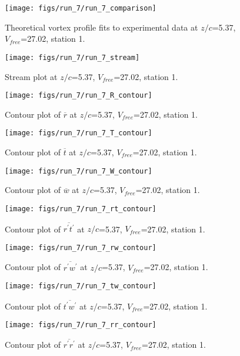 \begin{figure}[H]
\centering
\texttt{[image: figs/run\_7/run\_7\_comparison]}
\caption{Theoretical vortex profile fits to experimental data at $z/c$=5.37, $V_{free}$=27.02, station 1.}
\end{figure}


\begin{figure}[H]
\centering
\texttt{[image: figs/run\_7/run\_7\_stream]}
\caption{Stream plot at $z/c$=5.37, $V_{free}$=27.02, station 1.}
\end{figure}


\begin{figure}[H]
\centering
\texttt{[image: figs/run\_7/run\_7\_R\_contour]}
\caption{Contour plot of $\overline{r}$ at $z/c$=5.37, $V_{free}$=27.02, station 1.}
\end{figure}


\begin{figure}[H]
\centering
\texttt{[image: figs/run\_7/run\_7\_T\_contour]}
\caption{Contour plot of $\overline{t}$ at $z/c$=5.37, $V_{free}$=27.02, station 1.}
\end{figure}


\begin{figure}[H]
\centering
\texttt{[image: figs/run\_7/run\_7\_W\_contour]}
\caption{Contour plot of $\overline{w}$ at $z/c$=5.37, $V_{free}$=27.02, station 1.}
\end{figure}


\begin{figure}[H]
\centering
\texttt{[image: figs/run\_7/run\_7\_rt\_contour]}
\caption{Contour plot of $\overline{r^\prime t^\prime}$ at $z/c$=5.37, $V_{free}$=27.02, station 1.}
\end{figure}


\begin{figure}[H]
\centering
\texttt{[image: figs/run\_7/run\_7\_rw\_contour]}
\caption{Contour plot of $\overline{r^\prime w^\prime}$ at $z/c$=5.37, $V_{free}$=27.02, station 1.}
\end{figure}


\begin{figure}[H]
\centering
\texttt{[image: figs/run\_7/run\_7\_tw\_contour]}
\caption{Contour plot of $\overline{t^\prime w^\prime}$ at $z/c$=5.37, $V_{free}$=27.02, station 1.}
\end{figure}


\begin{figure}[H]
\centering
\texttt{[image: figs/run\_7/run\_7\_rr\_contour]}
\caption{Contour plot of $\overline{r^\prime r^\prime}$ at $z/c$=5.37, $V_{free}$=27.02, station 1.}
\end{figure}


